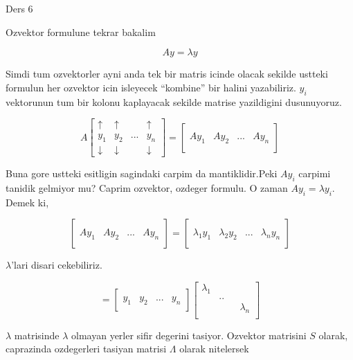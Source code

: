 \documentclass[12pt,fleqn]{article}\usepackage{../common}
\begin{document}
Ders 6

Ozvektor formulune tekrar bakalim

\[ Ay = \lambda y \]

Simdi tum ozvektorler ayni anda tek bir matris icinde olacak sekilde
ustteki formulun her ozvektor icin isleyecek ``kombine'' bir halini
yazabiliriz. $y_i$ vektorunun tum bir kolonu kaplayacak sekilde matrise
yazildigini dusunuyoruz. 

\[ 
A 
\left[\begin{array}{cccc}
\uparrow & \uparrow &  & \uparrow \\
y_1 & y_2 & ... & y_n \\
\downarrow & \downarrow &  & \downarrow 
\end{array}\right]
= 
\left[\begin{array}{cccc}
&&& \\
Ay_1 & Ay_2 & ... & Ay_n \\
&&& 
\end{array}\right]
\]

Buna gore ustteki esitligin sagindaki carpim da mantiklidir.Peki $Ay_i$
carpimi tanidik gelmiyor mu? Caprim ozvektor, ozdeger formulu. O zaman
$Ay_i = \lambda y_i$. Demek ki,

\[ 
\left[\begin{array}{cccc}
&&& \\
Ay_1 & Ay_2 & ... & Ay_n \\
&&& 
\end{array}\right]
= 
\left[\begin{array}{cccc}
&&& \\
\lambda_1y_1 & \lambda_2y_2 & ... & \lambda_ny_n \\
&&& 
\end{array}\right]
 \]

$\lambda$'lari disari cekebiliriz. 

\[ 
=
\left[\begin{array}{cccc}
&&& \\
y_1 & y_2 & ... & y_n \\
&&& 
\end{array}\right]
\left[\begin{array}{cccc}
\lambda_1 &&& \\
& .. && \\
&&& \lambda_n \\
\end{array}\right]
 \]

$\lambda$ matrisinde $\lambda$ olmayan yerler sifir degerini
tasiyor. Ozvektor matrisini $S$ olarak, caprazinda ozdegerleri tasiyan
matrisi $\Lambda$ olarak nitelersek
\end{document}
